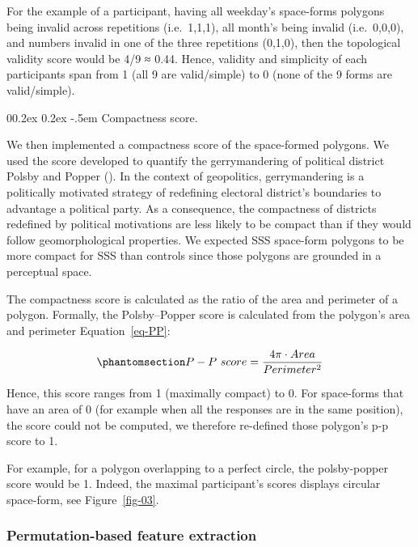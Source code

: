 \documentclass[
  man,
  floatsintext,
  longtable,
  a4paper,
  nolmodern,
  notxfonts,
  notimes,
  colorlinks=true,linkcolor=blue,citecolor=blue,urlcolor=blue]{apa7}
\makeatletter
\renewcommand{\paragraph}{\@startsection{paragraph}{4}{\parindent}%
	{0\baselineskip \@plus 0.2ex \@minus 0.2ex}%
	{-.5em}%
	{\normalfont\normalsize\bfseries\typesectitle}}
\newcounter{none} %
\makeatother
\begin{document}
For the example of a participant, having all weekday's space-forms
polygons being invalid across repetitions (i.e.~1,1,1), all month's
being invalid (i.e.~0,0,0), and numbers invalid in one of the three
repetitions (0,1,0), then the topological validity score would be 4/9 ≈
0.44. Hence, validity and simplicity of each participants span from 1
(all 9 are valid/simple) to 0 (none of the 9 forms are valid/simple).

\paragraph{Compactness score.}\label{compactness-score}

We then implemented a compactness score of the space-formed polygons. We
used the score developed to quantify the gerrymandering of political
district Polsby and Popper (). In the
context of geopolitics, gerrymandering is a politically motivated
strategy of redefining electoral district's boundaries to advantage a
political party. As a consequence, the compactness of districts
redefined by political motivations are less likely to be compact than if
they would follow geomorphological properties. We expected SSS
space-form polygons to be more compact for SSS than controls since those
polygons are grounded in a perceptual space.

The compactness score is calculated as the ratio of the area and
perimeter of a polygon. Formally, the Polsby--Popper score is calculated
from the polygon's area and perimeter Equation~\ref{eq-PP}:

\begin{equation}\protect\phantomsection\label{eq-PP}{P - P\ score = \frac{4\pi \cdot Area}{Perimeter^2}}\end{equation}

Hence, this score ranges from 1 (maximally compact) to 0. For
space-forms that have an area of 0 (for example when all the responses
are in the same position), the score could not be computed, we therefore
re-defined those polygon's p-p score to 1.

For example, for a polygon overlapping to a perfect circle, the
polsby-popper score would be 1. Indeed, the maximal participant's scores
displays circular space-form, see Figure~\ref{fig-03}.

\subsubsection{Permutation-based feature
extraction}\label{sec-permutation-based-feature-extraction}
\end{document}
